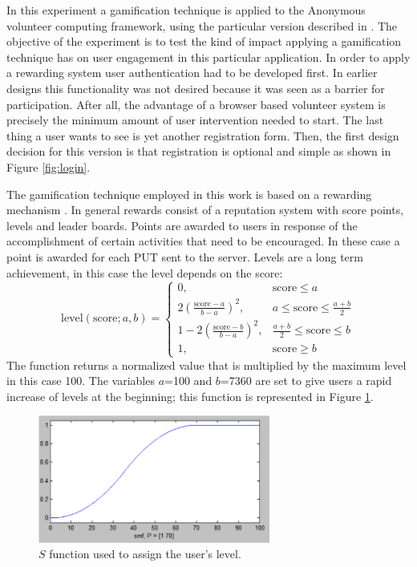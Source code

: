 \documentclass{llncs}
\begin{document}
In this experiment a gamification technique is applied to
the Anonymous
volunteer computing framework, using the
particular version described in \cite{DBLP:conf/gecco/MereloCGCRV16,2016arXiv160101607M}.
The objective of the experiment is to test the kind of impact
applying a gamification technique has on user engagement in this
particular application. In order to apply a rewarding system
user authentication had to be developed first. In earlier designs
this functionality was not desired because it was seen as a barrier
for participation. After all, the advantage of a browser based volunteer system
is precisely the minimum amount of user intervention needed to start.
The last thing a user wants to see is yet another registration form.
Then, the first design decision for this version is that registration is optional and simple as shown in Figure \ref{fig:login}.

The gamification technique employed in this work is based on a rewarding mechanism
\cite{dubois2013understanding}. In general rewards  consist of a reputation system
with score points, levels and leader boards. Points are awarded to users in response of
the accomplishment of certain activities that need to be encouraged. In these case
a point is awarded for each PUT sent to the server. Levels are a long
term achievement, in this case the level depends on the score:
\[ \text{level}(\text{score};a,b)=
    \begin{cases}
      0,                                    &  \text{score}\leq a\\
      2(\frac{\text{score}-a}{b-a})^{2},    &  a\leq \text{score}\leq \frac{a+b}{2}\\
      1-2(\frac{\text{score}-b}{b-a})^{2},  & \frac{a+b}{2} \leq \text{score}\leq b\\
      1,                                    & \text{score}\geq b
   \end{cases}
\]
The function returns a normalized value that is multiplied by the maximum level
in this case 100. The variables $a$=100 and $b$=7360 are set to give users a rapid increase of
levels at the beginning; this function is represented in Figure \ref{fig:s}.
%
\begin{figure}[htb]
    \centering
        \includegraphics[width=3in]{img/s.png}
    \caption{$S$ function used to assign the user's level.
    }
    \label{fig:s}
\end{figure}
\end{document}
